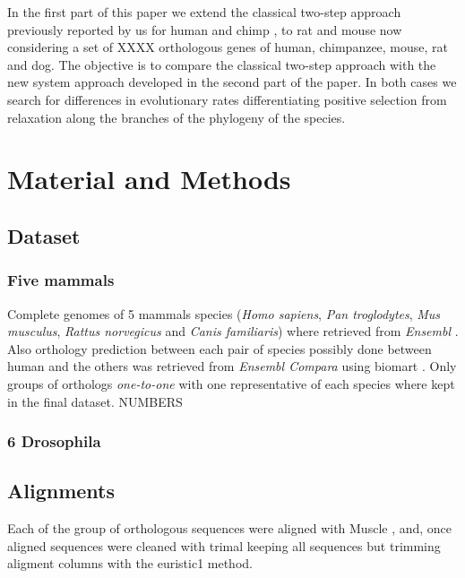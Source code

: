 In the first part of this paper we extend the classical two-step approach previously reported by us for human and chimp \cite{Arbiza2006}, to rat and mouse now considering a set of XXXX orthologous genes of human, chimpanzee, mouse, rat and dog. The objective is to compare the classical two-step approach with the new system approach developed in the second part of the paper. In both cases we search for differences in evolutionary rates differentiating positive selection from relaxation along the branches of the phylogeny of the species.

\section{Material and Methods}

\subsection{Dataset}

\subsubsection{Five mammals}

Complete genomes of 5 mammals species (\textit{Homo sapiens}, \textit{Pan troglodytes}, \textit{Mus musculus}, \textit{Rattus norvegicus} and \textit{Canis familiaris}) where retrieved from \textit{Ensembl} \cite{Flicek2011}. Also orthology prediction between each pair of species
possibly done between human and the others was retrieved from \textit{Ensembl Compara} \cite{Vilella2009} using biomart \cite{Kinsella2011}. Only groups of orthologs \textit{one-to-one} with one representative of each species where kept in the final dataset. 
NUMBERS

\subsubsection{6 Drosophila}

\subsection{Alignments}
Each of the group of orthologous sequences were aligned with Muscle \cite{Edgar2004}, and, once aligned sequences were cleaned with trimal \cite{Capella-Gutierrez2009} keeping all sequences but trimming aligment columns with the euristic1 method.


